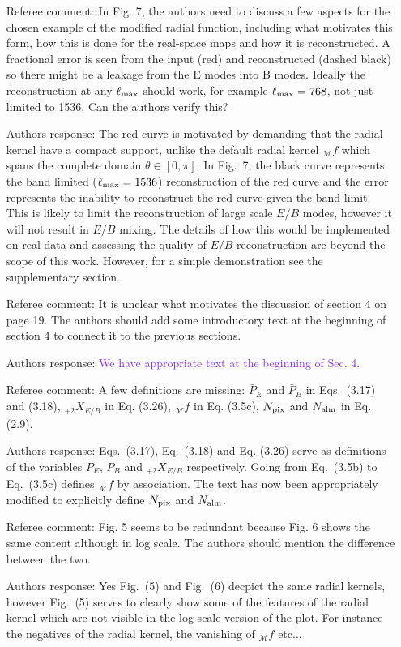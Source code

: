 \documentclass[12pt]{article}
\newcommand{\addtext}{\textcolor{BlueViolet}  }
\begin{document}
\begin{itemize}
\item[{Referee comment: }] In Fig. 7, the authors need to discuss a few aspects for the chosen example of the modified radial function, including what motivates this form, how this is done for the real-space maps and how it is reconstructed. A fractional error is seen from the input (red) and reconstructed (dashed black) so there might be a leakage from the E modes into B modes. Ideally the reconstruction at any $\ell_{\rm max}$ should work, for example $\ell_{\rm max} = 768$, not just limited to 1536. Can the authors verify this?
\item[{Authors response: }] The red curve is motivated by demanding that the radial kernel have a compact support, unlike the default radial kernel ${}_\mathcal{M} f$ which spans the complete domain $\theta \in [0,\pi]$. In Fig.~7, the black curve represents the band limited ($\ell_{\rm max}=1536$) reconstruction of the red curve and the error represents the inability to reconstruct the red curve given the band limit. This is likely to limit the reconstruction of large scale $E/B$ modes, however it will not result in $E/B$ mixing. The details of how this would be implemented on real data and assessing the quality of $E/B$ reconstruction are beyond the scope of this work. However, for a simple demonstration see the supplementary section.

\item[{Referee comment: }] It is unclear what motivates the discussion of section 4 on page 19. The authors should add some introductory text at the beginning of section 4 to connect it to the previous sections.
\item[{Authors response: }] \addtext{We have appropriate text at the beginning of Sec. 4.}

\item[{Referee comment: }] A few definitions are missing: $\bar P_E$ and $\bar P_B$ in Eqs.~(3.17) and (3.18), ${}_{+2} X_{E/B}$ in Eq. (3.26), ${}_\mathcal{M} f$ in Eq. (3.5c), $N_{\rm pix}$ and $N_{\rm alm}$ in Eq. (2.9).
\item[{Authors response: }] Eqs.~(3.17),  Eq.~(3.18) and Eq. (3.26) serve as definitions of the variables $\bar P_E$, $\bar P_B$ and ${}_{+2} X_{E/B}$ respectively. Going from Eq.~(3.5b) to Eq.~(3.5c) defines ${}_\mathcal{M} f$ by association. The text has now been appropriately modified to explicitly define $N_{\rm pix}$ and $N_{\rm alm}$.

\item[{Referee comment: }] Fig. 5 seems to be redundant because Fig. 6 shows the same content although in log scale. The authors should mention the difference between the two.
\item[{Authors response: }] Yes Fig.~(5) and Fig.~(6) decpict the same radial kernels, however Fig.~(5) serves to clearly show some of the features of the radial kernel which are not visible in the log-scale version of the plot. For instance the negatives of the radial kernel, the vanishing of ${}_\mathcal{M}f$ etc...


\end{itemize}
\end{document}
